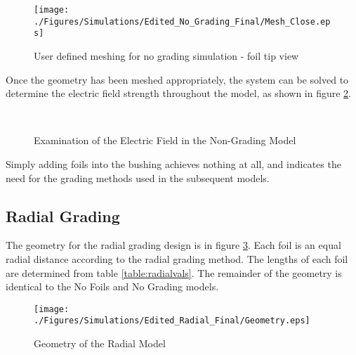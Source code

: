\begin{figure}[!h]
  \centering
    \texttt{[image: ./Figures/Simulations/Edited\_No\_Grading\_Final/Mesh\_Close.eps]} 
	\caption{User defined meshing for no grading simulation - foil tip view}
\label{Figure:No_Grading_Mesh2}
\end{figure}

Once the geometry has been meshed appropriately, the system can be solved to determine the electric field strength throughout the model, as shown in figure \ref{Figure:No_Grading_Field}.


\begin{figure}[!h]
  \centering
   \\

 \quad
{}
\caption{Examination of the Electric Field in the Non-Grading Model}
\label{Figure:No_Grading_Field}
\end{figure}

Simply adding foils into the bushing achieves nothing at all, and indicates the need for the grading methods used in the subsequent models.


\subsection{Radial Grading}
The geometry for the radial grading design is in figure \ref{Figure:Radial_Geom}. 
Each foil is an equal radial distance according to the radial grading method.
The lengths of each foil are determined from table \ref{table:radialvals}.
The remainder of the geometry is identical to the No Foils and No Grading models.
\begin{figure}[!h]
  \centering
    \texttt{[image: ./Figures/Simulations/Edited\_Radial\_Final/Geometry.eps]} 
	\caption{Geometry of the Radial Model}
	\label{Figure:Radial_Geom}
\end{figure}

